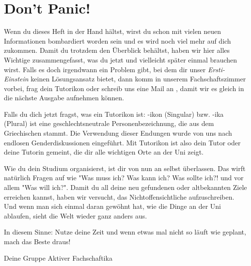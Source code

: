 %
%

\chapter{Don't Panic!}

Wenn du dieses Heft in der Hand hältst, wirst du schon mit vielen neuen Informationen bombardiert worden sein und es wird noch viel mehr auf dich zukommen. Damit du trotzdem den Überblick behältst, haben wir hier alles Wichtige zusammengefasst, was du jetzt und vielleicht später einmal brauchen wirst. Falls es doch irgendwann ein Problem gibt, bei dem dir unser \emph{Ersti-Einstein} keinen Lösungsansatz bietet, dann komm in unserem Fachschaftszimmer vorbei, frag dein Tutorikon oder schreib uns eine Mail an , damit wir es gleich in die nächste Ausgabe aufnehmen können. 

Falls du dich jetzt fragst, was ein Tutorikon ist: -ikon (Singular) bzw. -ika (Plural) ist eine geschlechtsneutrale Personenbezeichnung, die aus dem Griechischen stammt. Die Verwendung dieser Endungen wurde von uns nach endlosen Genderdiskussionen eingeführt. Mit Tutorikon ist also dein Tutor oder deine Tutorin gemeint, die dir alle wichtigen Orte an der Uni zeigt.

Wie du dein Studium organisierst, ist dir von nun an selbst überlassen. Das wirft natürlich Fragen auf wie "Was muss ich? Was kann ich? Was sollte ich?! und vor allem "Was will ich?". Damit du all deine neu gefundenen oder altbekannten Ziele erreichen kannst, haben wir versucht, das Nichtoffensichtliche aufzuschreiben. Und wenn man sich einmal daran gewöhnt hat, wie die Dinge an der Uni ablaufen, sieht die Welt wieder ganz anders aus.

In diesem Sinne: Nutze deine Zeit und wenn etwas mal nicht so läuft wie geplant, mach das Beste draus!

Deine Gruppe Aktiver Fachschaftika
